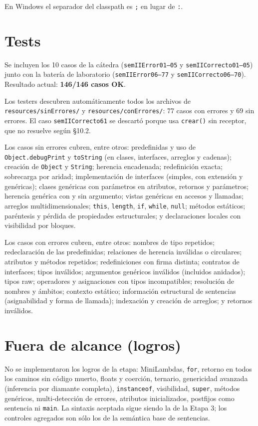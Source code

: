 \documentclass[11pt,a4paper]{article}
\begin{document}
En Windows el separador del classpath es \texttt{;} en lugar de \texttt{:}.

\section{Tests}

Se incluyen los 10 casos de la cátedra (\texttt{semIIError01--05} y
\texttt{semIICorrecto01--05}) junto con la batería de laboratorio
(\texttt{semIIError06--77} y \texttt{semIICorrecto06--70}). Resultado actual:
\textbf{146/146 casos OK}.

Los testers descubren automáticamente todos los archivos de
\texttt{resources/sinErrores/} y \texttt{resources/conErrores/}: 77 casos con
errores y 69 sin errores. El caso \texttt{semIICorrecto61} se descartó porque usa
\texttt{crear()} sin receptor, que no resuelve según §10.2.

Los casos sin errores cubren, entre otros: predefinidas y uso de
\texttt{Object.debugPrint} y \texttt{toString} (en clases, interfaces, arreglos y
cadenas); creación de \texttt{Object} y \texttt{String}; herencia encadenada;
redefinición exacta; sobrecarga por aridad; implementación de interfaces (simples,
con extensión y genéricas); clases genéricas con parámetros en atributos, retornos
y parámetros; herencia genérica con y sin argumento; vistas genéricas en accesos y
llamadas; arreglos multidimensionales; \texttt{this}, \texttt{length},
\texttt{if}, \texttt{while}, \texttt{null}; métodos estáticos; paréntesis y
pérdida de propiedades estructurales; y declaraciones locales con visibilidad por
bloques.

Los casos con errores cubren, entre otros: nombres de tipo repetidos;
redeclaración de las predefinidas; relaciones de herencia inválidas o circulares;
atributos y métodos repetidos; redefiniciones con firma distinta; contratos de
interfaces; tipos inválidos; argumentos genéricos inválidos (incluidos anidados);
tipos raw; operadores y asignaciones con tipos incompatibles; resolución de
nombres y ámbitos; contexto estático; información estructural de sentencias
(asignabilidad y forma de llamada); indexación y creación de arreglos; y retornos
inválidos.

\section{Fuera de alcance (logros)}

No se implementaron los logros de la etapa: MiniLambdas, \texttt{for}, retorno en
todos los caminos sin código muerto, floats y coerción, ternario, genericidad
avanzada (inferencia por diamante completa), \texttt{instanceof}, visibilidad,
\texttt{super}, métodos genéricos, multi-detección de errores, atributos
inicializados, postfijos como sentencia ni \texttt{main}. La sintaxis aceptada
sigue siendo la de la Etapa 3; los controles agregados son sólo los de la
semántica base de sentencias.
\end{document}
